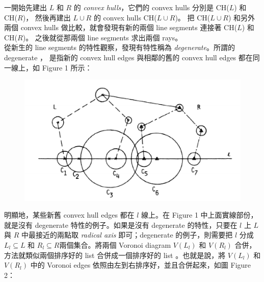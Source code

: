 \documentclass[12pt]{article}
\begin{document}
\begin{CJK}{UTF8}{bkai}
一開始先建出 $L$ 和 $R$ 的 {\it convex hulls}，它們的 convex hulls 分別是 CH($L$) 和 CH($R$)，
然後再建出 $L \cup R$ 的 convex hulls CH($L \cup R$)。
把 CH($L \cup R$) 和另外兩個 convex hulls 做比較，就會發現有新的兩個 line segments 連接著
 CH($L$) 和 CH($R$)。
之後就從那兩個 line segments 求出兩個 rays。\\

從新生的 line segments 的特性觀察，發現有特性稱為 {\it degenerate}。所謂的 degenerate ，
是指新的 convex hull edges 與相鄰的舊的 convex hull edges 都在同一線上，如 Figure 1 所示：\\


\begin{figure}
\includegraphics[scale=0.5]{figure5(i).eps}
\caption{}
\label{}
\end{figure}

明顯地，某些新舊 convex hull edges 都在 $l$ 線上。在 Figure 1 中上面實線部份，就是沒有 degenerate
 特性的例子。如果是沒有 degenerate 的特性，只要在 $l$ 上 $L$ 與 $R$ 中最接近的兩點取 {\it radical axis}
 即可；degenerate 的例子，則需要把 $l$ 分成 $L_l \subseteq L$ 和 $R_l \subseteq R$兩個集合。將兩個 Voronoi
 diagram $V(L_l)$ 和 $V(R_l)$ 合併，方法就類似兩個排序好的 list 合併成一個排序好的 list 。也就是說，將 $V(L_l)$
 和 $V(R_l)$ 中的 Voronoi edges 依照由左到右排序好，並且合併起來，如圖 Figure 2：



\end{CJK}
\end{document}
